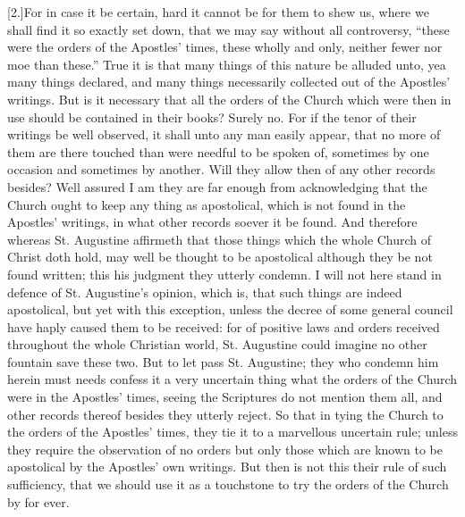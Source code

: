 [2.]For in case it be certain, hard it cannot be for them to shew us, where we shall find it so exactly set down, that we may say without all controversy, “these were the orders of the Apostles’ times, these wholly and only, neither fewer nor moe than these.” True it is that many things of this nature be alluded unto, yea many things declared, and many things necessarily collected out of the Apostles’ writings. But is it necessary that all the orders of the Church which were then in use should be contained in their books? Surely no. For if the tenor of their writings be well observed, it shall unto any man easily appear, that no more of them are there touched than were needful to be spoken of, sometimes  by one occasion and sometimes by another. Will they allow then of any other records besides? Well assured I am they are far enough from acknowledging that the Church ought to keep any thing as apostolical, which is not found in the Apostles’ writings, in what other records soever it be found. And therefore whereas St. Augustine affirmeth that those things which the whole Church of Christ doth hold, may well be thought to be apostolical although they be not found written; this his judgment they utterly condemn. I will not here stand in defence of St. Augustine’s opinion, which is, that such things are indeed apostolical, but yet with this exception, unless the decree of some general council have haply caused them to be received: for of positive laws and orders received throughout the whole Christian world, St. Augustine could imagine no other fountain save these two. But to let pass St. Augustine; they who condemn him herein must needs confess it a very uncertain thing what the orders of the Church were in the Apostles’ times, seeing the Scriptures do not mention them all, and other records thereof besides they utterly reject. So that in tying the Church to the orders of the Apostles’ times, they tie it to a marvellous uncertain rule; unless they require the observation of no orders but only those which are known to be apostolical by the Apostles’ own writings. But then is not this their rule of such sufficiency, that we should use it as a touchstone to try the orders of the Church by for ever.

